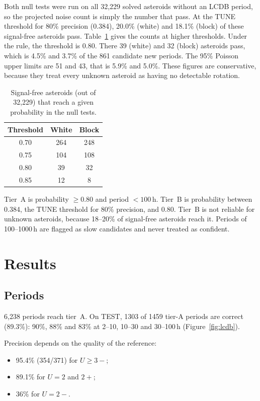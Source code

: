 Both null tests were run on all 32{,}229 solved asteroids without an LCDB period, so the projected
noise count is simply the number that pass. At the TUNE threshold for 80\% precision (0.384), 20.0\%
(white) and 18.1\% (block) of these signal-free asteroids pass. Table~\ref{tab:null} gives the counts at
higher thresholds. Under the rule, the threshold is 0.80. There 39 (white) and 32 (block) asteroids
pass, which is 4.5\% and 3.7\% of the 861 candidate new periods. The 95\% Poisson upper limits are 51
and 43, that is 5.9\% and 5.0\%. These figures are conservative, because they treat every unknown
asteroid as having no detectable rotation.

\begin{table}
\centering
\caption{Signal-free asteroids (out of 32{,}229) that reach a given probability in the null tests.}\label{tab:null}
\begin{tabular}{ccc}
\hline
Threshold & White & Block \\
\hline
0.70 & 264 & 248 \\
0.75 & 104 & 108 \\
0.80 & 39 & 32 \\
0.85 & 12 & 8 \\
\hline
\end{tabular}
\end{table}

Tier~A is probability $\ge0.80$ and period $<100$\,h. Tier~B is probability between 0.384, the TUNE
threshold for 80\% precision, and 0.80. Tier~B is not reliable for unknown asteroids, because 18--20\% of
signal-free asteroids reach it. Periods of 100--1000\,h are flagged as slow candidates and never treated
as confident.

\section{Results}

\subsection{Periods}

6{,}238 periods reach tier~A. On TEST, 1303 of 1459 tier-A periods are correct (89.3\%): 90\%, 88\% and 83\%
at 2--10, 10--30 and 30--100\,h (Figure~\ref{fig:lcdb}).

Precision depends on the quality of the reference:
\begin{itemize}
\item 95.4\% (354/371) for $U\ge3-$;
\item 89.1\% for $U=2$ and $2+$;
\item 36\% for $U=2-$.
\end{itemize}

